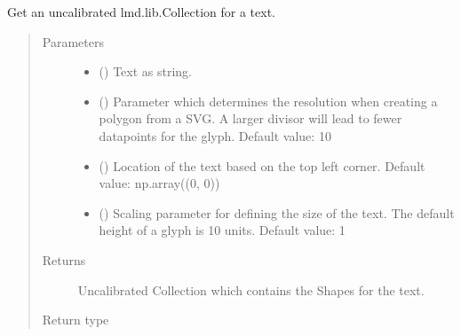 \documentclass[letterpaper,10pt,english,openany,oneside]{sphinxmanual}
\begin{document}

\begin{fulllineitems}
\label{\detokenize{pages/modules:lmd.tools.text}}
\sphinxAtStartPar
Get an uncalibrated lmd.lib.Collection for a text.
\begin{quote}\begin{description}
\item[{Parameters}] \leavevmode\begin{itemize}
\item {} 
\sphinxAtStartPar
{} () \textendash{} Text as string.

\item {} 
\sphinxAtStartPar
{} () \textendash{} Parameter which determines the resolution when creating a polygon from a SVG. A larger divisor will lead to fewer datapoints for the glyph. Default value: 10

\item {} 
\sphinxAtStartPar
{} () \textendash{} Location of the text based on the top left corner. Default value: np.array((0, 0))

\item {} 
\sphinxAtStartPar
{} () \textendash{} Scaling parameter for defining the size of the text. The default height of a glyph is 10 units. Default value: 1

\end{itemize}

\item[{Returns}] \leavevmode
\sphinxAtStartPar
Uncalibrated Collection which contains the Shapes for the text.

\item[{Return type}] \leavevmode
\sphinxAtStartPar
{\hyperref[\detokenize{pages/modules:lmd.lib.Collection}]{}}


\end{description}
\end{quote}
\end{fulllineitems}
\end{document}
